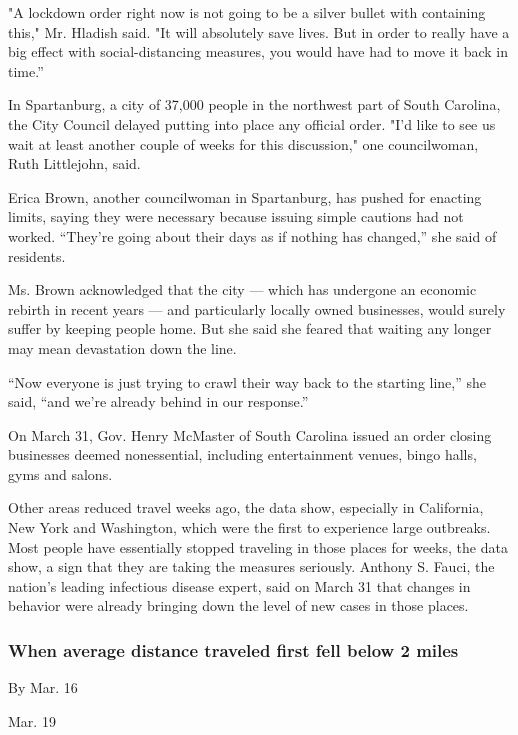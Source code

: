 "A lockdown order right now is not going to be a silver bullet with
containing this," Mr. Hladish said. "It will absolutely save lives. But
in order to really have a big effect with social-distancing measures,
you would have had to move it back in time.''

In Spartanburg, a city of 37,000 people in the northwest part of South
Carolina, the City Council delayed putting into place any official
order. "I'd like to see us wait at least another couple of weeks for
this discussion," one councilwoman, Ruth Littlejohn, said.

Erica Brown, another councilwoman in Spartanburg, has pushed for
enacting limits, saying they were necessary because issuing simple
cautions had not worked. ``They're going about their days as if nothing
has changed,'' she said of residents.

Ms. Brown acknowledged that the city --- which has undergone an economic
rebirth in recent years --- and particularly locally owned businesses,
would surely suffer by keeping people home. But she said she feared that
waiting any longer may mean devastation down the line.

``Now everyone is just trying to crawl their way back to the starting
line,'' she said, ``and we're already behind in our response.''

On March 31, Gov. Henry McMaster of South Carolina issued an order
closing businesses deemed nonessential, including entertainment venues,
bingo halls, gyms and salons.

Other areas reduced travel weeks ago, the data show, especially in
California, New York and Washington, which were the first to experience
large outbreaks. Most people have essentially stopped traveling in those
places for weeks, the data show, a sign that they are taking the
measures seriously. Anthony S. Fauci, the nation's leading infectious
disease expert, said on March 31 that changes in behavior were already
bringing down the level of new cases in those places.

\hypertarget{when-average-distance-traveled-first-fell-below-2-miles}{%
\subsubsection{When average distance traveled first fell below 2
miles}\label{when-average-distance-traveled-first-fell-below-2-miles}}

By Mar. 16

Mar. 19

